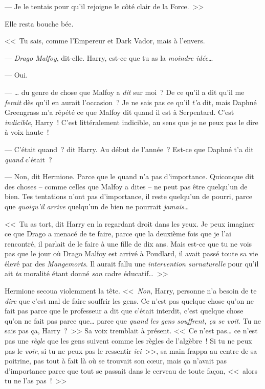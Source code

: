 --- Je le tentais pour qu'il rejoigne le côté clair de la Force.~>>

Elle resta bouche bée.

<<~Tu sais, comme l'Empereur et Dark Vador, mais à l'envers.

--- \emph{Drago Malfoy}, dit-elle. Harry, est-ce que tu as la \emph{moindre idée}…

--- Oui.

--- … du genre de chose que Malfoy a \emph{dit} sur moi~? De ce qu'il a dit qu'il me \emph{ferait} dès qu'il en aurait l'occasion~? Je ne sais pas ce qu'il \emph{t'a} dit, mais Daphné Greengrass m'a répété ce que Malfoy dit quand il est à Serpentard. C'est \emph{indicible}, Harry~! C'est littéralement indicible, au sens que je ne peux pas le dire à voix haute~!

--- C'était quand~? dit Harry. Au début de l'année~? Est-ce que Daphné t'a dit \emph{quand} c'était~?

--- Non, dit Hermione. Parce que le quand n'a pas d'importance. Quiconque dit des choses -- comme celles que Malfoy a dites -- ne peut pas être quelqu'un de bien. Tes tentations n'ont pas d'importance, il reste quelqu'un de pourri, parce que \emph{quoiqu'il arrive} quelqu'un de bien ne pourrait \emph{jamais}…

<<~Tu as tort, dit Harry en la regardant droit dans les yeux. Je peux imaginer ce que Drago a menacé de te faire, parce que la deuxième fois que je l'ai rencontré, il parlait de le faire à une fille de dix ans. Mais est-ce que tu ne vois pas que le jour où Drago Malfoy est arrivé à Poudlard, il avait passé toute sa vie élevé par des \emph{Mangemorts}. Il aurait fallu une \emph{intervention surnaturelle} pour qu'il ait \emph{ta} moralité étant donné \emph{son} cadre éducatif…~>>

Hermione secoua violemment la tête. <<~\emph{Non}, Harry, personne n'a besoin de te \emph{dire} que c'est mal de faire souffrir les gens. Ce n'est pas quelque chose qu'on ne fait pas parce que le professeur a dit que c'était interdit, c'est quelque chose qu'on ne fait pas parce que… parce que \emph{quand les gens souffrent, ça se voit}. Tu ne sais pas ça, Harry~?~>> Sa voix tremblait à présent. <<~Ce n'est pas… ce n'est pas une \emph{règle} que les gens suivent comme les règles de l'algèbre~! Si tu ne peux pas le \emph{voir}, si tu ne peux pas le ressentir \emph{ici}~>>, sa main frappa au centre de sa poitrine, pas tout à fait là où se trouvait son cœur, mais ça n'avait pas d'importance parce que tout se passait dans le cerveau de toute façon, <<~alors tu ne l'as pas~!~>>

